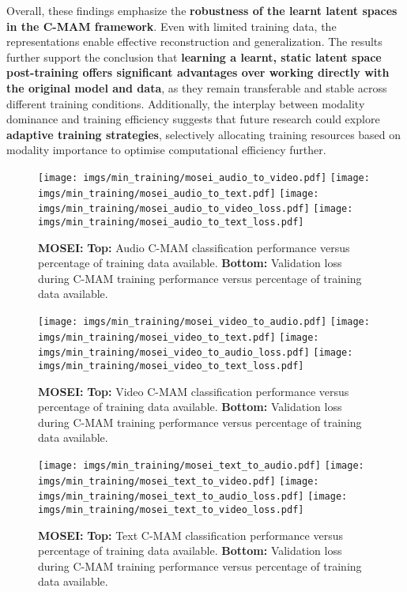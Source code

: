 Overall, these findings emphasize the \textbf{robustness of the learnt latent spaces in the C-MAM framework}. Even with limited training data, the representations enable effective reconstruction and generalization. The results further support the conclusion that \textbf{learning a learnt, static latent space post-training offers significant advantages over working directly with the original model and data}, as they remain transferable and stable across different training conditions. Additionally, the interplay between modality dominance and training efficiency suggests that future research could explore \textbf{adaptive training strategies}, selectively allocating training resources based on modality importance to optimise computational efficiency further.

\begin{figure}[h!]
    \centering
    \texttt{[image: imgs/min\_training/mosei\_audio\_to\_video.pdf]}
    \texttt{[image: imgs/min\_training/mosei\_audio\_to\_text.pdf]}
    \texttt{[image: imgs/min\_training/mosei\_audio\_to\_video\_loss.pdf]}
    \texttt{[image: imgs/min\_training/mosei\_audio\_to\_text\_loss.pdf]}


    \caption{\textbf{MOSEI:} \textbf{Top:} Audio C-MAM classification performance versus percentage of training data available. \textbf{Bottom: } Validation loss during C-MAM training performance versus percentage of training data available.}
    \label{fig:mosei_min_training_two}
\end{figure}


\begin{figure}[h!]
    \texttt{[image: imgs/min\_training/mosei\_video\_to\_audio.pdf]}
    \texttt{[image: imgs/min\_training/mosei\_video\_to\_text.pdf]}
    \texttt{[image: imgs/min\_training/mosei\_video\_to\_audio\_loss.pdf]}
    \texttt{[image: imgs/min\_training/mosei\_video\_to\_text\_loss.pdf]}
    \caption{\textbf{MOSEI:} \textbf{Top:} Video C-MAM classification performance versus percentage of training data available. \textbf{Bottom:} Validation loss during C-MAM training performance versus percentage of training data available.}
    \label{fig:mosei_min_training_three}
\end{figure}

\begin{figure}[h!]
    \texttt{[image: imgs/min\_training/mosei\_text\_to\_audio.pdf]}
    \texttt{[image: imgs/min\_training/mosei\_text\_to\_video.pdf]}
    \texttt{[image: imgs/min\_training/mosei\_text\_to\_audio\_loss.pdf]}
    \texttt{[image: imgs/min\_training/mosei\_text\_to\_video\_loss.pdf]}
    \caption{\textbf{MOSEI:} \textbf{Top:} Text C-MAM classification performance versus percentage of training data available. \textbf{Bottom:} Validation loss during C-MAM training performance versus percentage of training data available.}
    \label{fig:mosei_min_training_four}
\end{figure}

